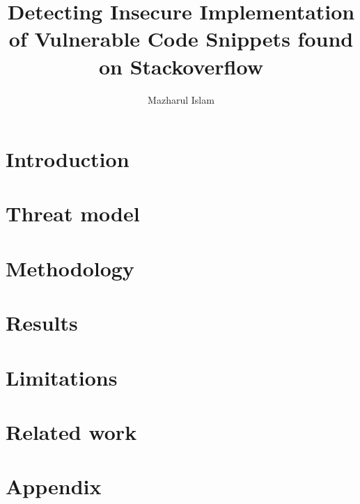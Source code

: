 \documentclass[sigconf]{acmart}
\begin{document}
\title{Detecting Insecure Implementation of Vulnerable Code Snippets found on Stackoverflow}
\author{Mazharul Islam}
  
\maketitle
\section{Introduction}

\section{Threat model}

\section{Methodology}

\section{Results}
      
\section{Limitations}


\section{Related work}





  
\section{Appendix}

\end{document}
